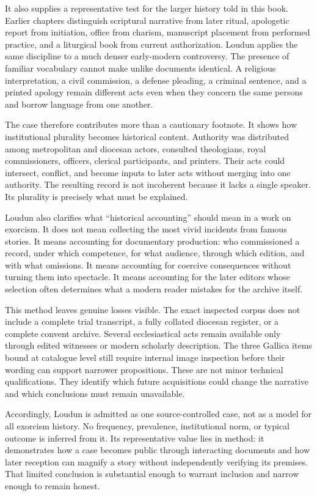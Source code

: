 It also supplies a representative test for the larger history told in this
book.  Earlier chapters distinguish scriptural narrative from later ritual,
apologetic report from initiation, office from charism, manuscript placement
from performed practice, and a liturgical book from current authorization.
Loudun applies the same discipline to a much denser early-modern controversy.
The presence of familiar vocabulary cannot make unlike documents identical.
A religious interpretation, a civil commission, a defense pleading, a
criminal sentence, and a printed apology remain different acts even when they
concern the same persons and borrow language from one another.

The case therefore contributes more than a cautionary footnote.  It shows how
institutional plurality becomes historical content.  Authority was distributed
among metropolitan and diocesan actors, consulted theologians, royal
commissioners, officers, clerical participants, and printers.  Their acts could
intersect, conflict, and become inputs to later acts without merging into one
authority.  The resulting record is not incoherent because it lacks a single
speaker.  Its plurality is precisely what must be explained.

Loudun also clarifies what ``historical accounting'' should mean in a work on
exorcism.  It does not mean collecting the most vivid incidents from famous
stories.  It means accounting for documentary production: who commissioned a
record, under which competence, for what audience, through which edition, and
with what omissions.  It means accounting for coercive consequences without
turning them into spectacle.  It means accounting for the later editors whose
selection often determines what a modern reader mistakes for the archive
itself.

This method leaves genuine losses visible.  The exact inspected corpus does
not include a complete trial transcript, a fully collated diocesan register,
or a complete convent archive.  Several ecclesiastical acts remain available
only through edited witnesses or modern scholarly description.  The three
Gallica items bound at catalogue level still require internal image inspection
before their wording can support narrower propositions.  These are not minor
technical qualifications.  They identify which future acquisitions could
change the narrative and which conclusions must remain unavailable.

Accordingly, Loudun is admitted as one source-controlled case, not as a model
for all exorcism history.  No frequency, prevalence, institutional norm, or
typical outcome is inferred from it.  Its representative value lies in method:
it demonstrates how a case becomes public through interacting documents and
how later reception can magnify a story without independently verifying its
premises.  That limited conclusion is substantial enough to warrant inclusion
and narrow enough to remain honest.
